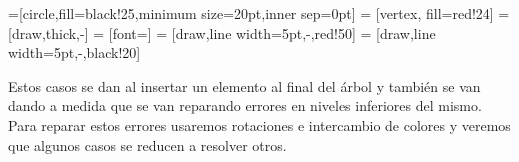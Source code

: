 \documentclass[dcc,sol]{fcfmcourse}
\begin{document}
\begin{itemize}
\begin{enumerate}
=[circle,fill=black!25,minimum size=20pt,inner sep=0pt]
 = [vertex, fill=red!24]
 = [draw,thick,-]
 = [font=\small]
 = [draw,line width=5pt,-,red!50]
 = [draw,line width=5pt,-,black!20]


\end{enumerate}
\end{itemize}

Estos casos se dan al insertar un elemento al final del árbol y también se van dando a medida que se van reparando errores en niveles inferiores del mismo.\\
Para reparar estos errores usaremos rotaciones e intercambio de colores y veremos que algunos casos se reducen a resolver otros.\\
\end{document}
